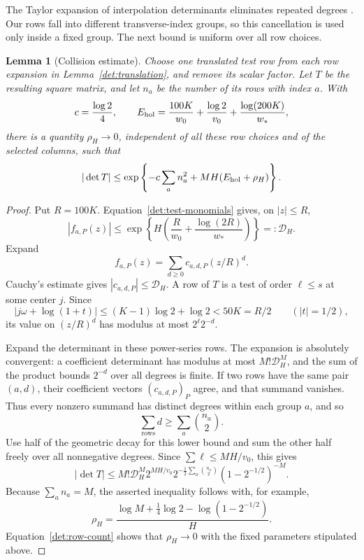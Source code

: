\documentclass[11pt]{article}
\newtheorem{lemma}[theorem]{Lemma}
\theoremstyle{definition}
\theoremstyle{remark}
\numberwithin{equation}{section}
\begin{document}
The Taylor expansion of interpolation determinants eliminates repeated
degrees \cite[Theorem~1]{laurent2000}. Our rows fall into different
transverse-index groups, so this cancellation is used only inside a
fixed group. The next bound is uniform over all row choices.

\begin{lemma}[Collision estimate]\label{det:collision}
Choose one translated test row from each row expansion in
Lemma~\ref{det:translation}, and remove its scalar factor.  Let $T$ be
the resulting square matrix, and let $n_a$ be the number of its rows
with index $a$.  With
\begin{equation}
 c=\frac{\log2}{4},\qquad
 E_{\rm hol}=\frac{100K}{w_0}+\frac{\log2}{v_0}
             +\frac{\log(200K)}{w_*},
 \label{det:hol-error}
\end{equation}
there is a quantity $\rho_H\to0$, independent of all these row
choices and of the selected columns, such that
\begin{equation}
 |\det T|
 \le\exp\left\{-c\sum_a n_a^2+MH(E_{\rm hol}+\rho_H)\right\}.
 \label{det:collision-bound}
\end{equation}
\end{lemma}

\begin{proof}
Put $R=100K$.  Equation~\eqref{det:test-monomials} gives, on $|z|\le R$,
\[
 |f_{a,P}(z)|\le
 \exp\left\{H\left(\frac R{w_0}
                      +\frac{\log(2R)}{w_*}\right)\right\}
 =:\mathcal D_H.
\]
Expand
\[
 f_{a,P}(z)=\sum_{d\ge0}c_{a,d,P}(z/R)^d.
\]
Cauchy's estimate gives $|c_{a,d,P}|\le\mathcal D_H$.  A row of $T$ is
a test of order $\ell\le s$ at some center $j$.  Since
\[
 |j\omega+\log(1+t)|
 \le(K-1)\log2+\log2<50K=R/2
 \qquad(|t|=1/2),
\]
its value on $(z/R)^d$ has modulus at most $2^\ell2^{-d}$.

Expand the determinant in these power-series rows.  The expansion is
absolutely convergent: a coefficient determinant has modulus at most
$M!\mathcal D_H^M$, and the sum of the product bounds $2^{-d}$ over
all degrees is finite.  If two rows have the same pair $(a,d)$, their
coefficient vectors $(c_{a,d,P})_P$ agree, and that summand vanishes.
Thus every nonzero summand has distinct degrees within each group
$a$, and so
\[
 \sum_{\text{rows}}d\ge\sum_a\binom{n_a}{2}.
\]
Use half of the geometric decay for this lower bound and sum the
other half freely over all nonnegative degrees.  Since
$\sum\ell\le MH/v_0$, this gives
\[
 |\det T|
 \le M!\mathcal D_H^M2^{MH/v_0}
       2^{-\frac12\sum_a\binom{n_a}{2}}
       (1-2^{-1/2})^{-M}.
\]
Because $\sum_a n_a=M$, the asserted inequality follows with, for
example,
\[
 \rho_H=\frac{\log M+\frac14\log2
                    -\log(1-2^{-1/2})}{H}.
\]
Equation~\eqref{det:row-count} shows that $\rho_H\to0$ with the fixed
parameters stipulated above.
\end{proof}
\end{document}
